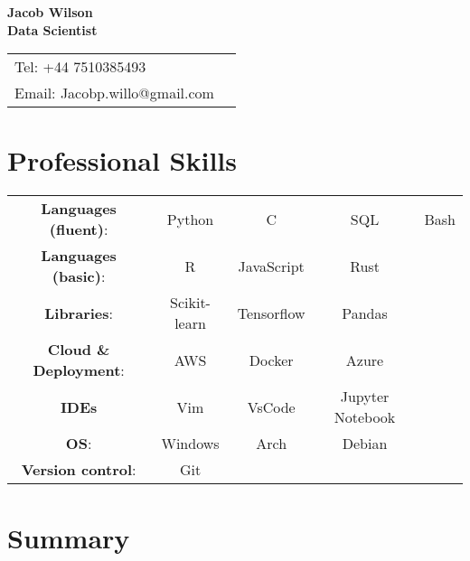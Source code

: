 \documentclass[10pt]{article}
\begin{document}
\linespread{1.0}



{\center
{\Large\bf Jacob Wilson \\ Data Scientist \vspace{0.1in} }

\begin{center}
\begin{tabular*}{1.0\textwidth}%
   {@{\extracolsep{\fill}}lr}
	Tel:   +44 7510385493\\
	Email: Jacobp.willo@gmail.com \\
\end{tabular*}
\end{center}


\addtolength{\itemsep}{-1ex} \addtolength{\topsep}{-1.5ex}


\section*{\bf  Professional Skills}
\begin{center}
\begin{tabular}{c c c c c}
{\bf Languages (fluent)}: & Python & C & SQL & Bash \\
{\bf Languages (basic)}: &  R & JavaScript & Rust\\
{\bf Libraries}:  & Scikit-learn & Tensorflow & Pandas \\
{\bf Cloud \& Deployment}: & AWS & Docker & Azure\\
{\bf IDEs} & Vim & VsCode & Jupyter Notebook \\
{\bf OS}: & Windows & Arch & Debian \\
    {\bf Version control}: & Git 

\end{tabular}
\end{center}


\section*{\bf Summary}

}
\end{document}
